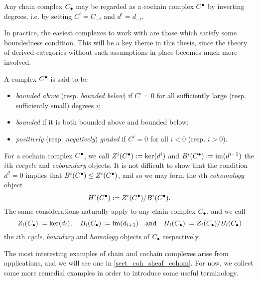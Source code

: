 \begin{proposition}
  Any chain complex ${{C}}_{\bullet}$ may be regarded as a cochain
  complex ${{C}}^{\bullet}$ by inverting degrees, i.e. by setting
  $C^i = C_{-i}$ and $d^i = d_{-i}$.
\end{proposition}

In practice, the easiest complexes to work with are those which
satisfy some boundedness condition.
This will be a key theme in this thesis, since the theory of derived
categories without such assumptions in place becomes much more involved.

\begin{definition}
  \label{def_bounded_cochain_complexes}
  A complex ${{C}}^{\bullet}$ is said to be
  \begin{itemize}
    \item
      \emph{bounded above} (resp. \emph{bounded below}) if $C^i = 0$
      for all sufficiently large (resp. sufficiently small) degrees $i$;

    \item
      \emph{bounded} if it is both bounded above and bounded below;

    \item
      \emph{positively} (resp. \emph{negatively}) \emph{graded} if
      $C^i = 0$ for all $i < 0$ (resp. $i > 0$).
  \end{itemize}
\end{definition}

For a cochain complex ${{C}}^{\bullet}$, we call
$Z^i({{C}}^{\bullet}) := \ker(d^i)$ and $B^i({{C}}^{\bullet}) :=
\operatorname{im}(d^{i - 1})$ the $i$th \emph{cocycle} and \emph{coboundary} objects.
It is not difficult to show that the condition $d^2 = 0$ implies that
$B^i({{C}}^{\bullet}) \leq Z^i({{C}}^{\bullet})$, and so we may form
the $i$th \emph{cohomology} object
\[
  H^i({{C}}^{\bullet})
  := {Z^i({{C}}^{\bullet})}\mathopen/{B^i({{C}}^{\bullet})}.
\]
The same considerations naturally apply to any chain complex
${{C}}_{\bullet}$, and we call
\[
  Z_i({{C}}_{\bullet}) := \ker(d_i),
  \quad
  B_i({{C}}_{\bullet}) := \operatorname{im}(d_{i + 1})
  \quad \text{and} \quad
  H_i({{C}}_{\bullet}) := {Z_i({{C}}_{\bullet})}\mathopen/{B_i({{C}}_{\bullet})}
\]
the $i$th \emph{cycle}, \emph{boundary} and \emph{homology} objects
of ${{C}}_{\bullet}$ respectively.

The most interesting examples of chain and cochain complexes arise
from applications, and we will see one in \cref{sect_coh_sheaf_cohom}.
For now, we collect some more remedial examples in order to introduce
some useful terminology.

